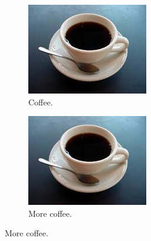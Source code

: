 


% 

\begin{figure}[h!]
  \centering
  \begin{subfigure}[b]{0.2\linewidth}
    \includegraphics[width=\linewidth]{figures/coffee.jpg}
     \caption{Coffee.}
  \end{subfigure}
  \begin{subfigure}[b]{0.2\linewidth}
    \includegraphics[width=\linewidth]{figures/coffee.jpg}
    \caption{More coffee.}

\end{subfigure}
\end{figure}
